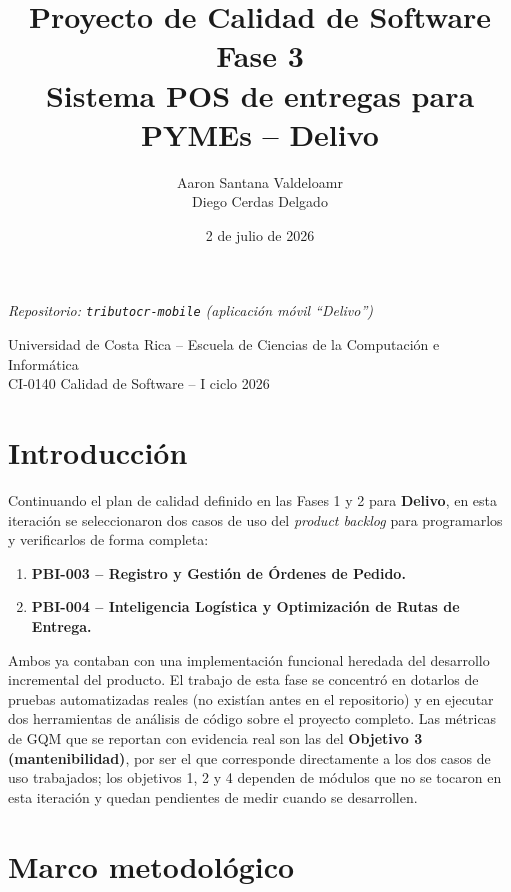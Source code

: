 \documentclass[11pt,a4paper]{article}
\title{\vspace{-2cm}Proyecto de Calidad de Software\\[0.3cm]\Huge\textbf{Fase 3}\\[0.3cm]\large Sistema POS de entregas para PYMEs -- Delivo}
\author{Aaron Santana Valdeloamr \\ Diego Cerdas Delgado}
\date{2 de julio de 2026}
\begin{document}
\maketitle
\thispagestyle{fancy}
\begin{center}
\textit{Repositorio: \texttt{tributocr-mobile} (aplicación móvil ``Delivo'')}
\end{center}
\vfill
\begin{center}
\small Universidad de Costa Rica -- Escuela de Ciencias de la Computación e Informática\\
CI-0140 Calidad de Software -- I ciclo 2026
\end{center}

\newpage
\tableofcontents
\newpage

\section{Introducción}

Continuando el plan de calidad definido en las Fases 1 y 2 para \textbf{Delivo}, en esta
iteración se seleccionaron dos casos de uso del \textit{product backlog} para programarlos y
verificarlos de forma completa:

\begin{enumerate}
  \item \textbf{PBI-003 -- Registro y Gestión de Órdenes de Pedido.}
  \item \textbf{PBI-004 -- Inteligencia Logística y Optimización de Rutas de Entrega.}
\end{enumerate}

Ambos ya contaban con una implementación funcional heredada del desarrollo incremental del
producto. El trabajo de esta fase se concentró en dotarlos de pruebas automatizadas reales
(no existían antes en el repositorio) y en ejecutar dos herramientas de análisis de código
sobre el proyecto completo. Las métricas de GQM que se reportan con evidencia real son las
del \textbf{Objetivo 3 (mantenibilidad)}, por ser el que corresponde directamente a los dos
casos de uso trabajados; los objetivos 1, 2 y 4 dependen de módulos que no se tocaron en
esta iteración y quedan pendientes de medir cuando se desarrollen.

\section{Marco metodológico}
\end{document}
